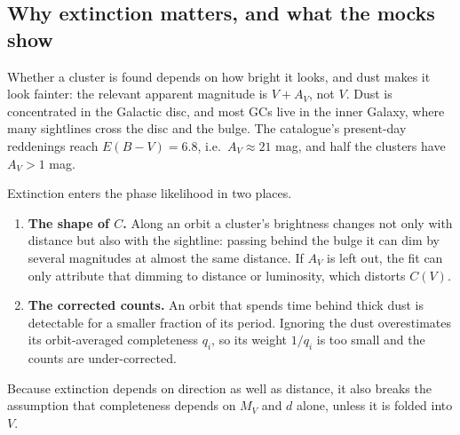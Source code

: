 \documentclass[11pt,a4paper]{article}
\newcommand{\MV}{M_V}
\newcommand{\dhel}{d}
\begin{document}
\subsection{Why extinction matters, and what the mocks show}
\label{sec:whydust}

Whether a cluster is found depends on how bright it looks, and dust makes it look fainter: the
relevant apparent magnitude is $V + A_V$, not $V$. Dust is concentrated in the Galactic disc, and
most GCs live in the inner Galaxy, where many sightlines cross the disc and the bulge. The
catalogue's present-day reddenings reach $E(B-V) = 6.8$, i.e.\ $A_V \approx 21$ mag, and half the
clusters have $A_V > 1$ mag.

Extinction enters the phase likelihood in two places.
\begin{enumerate}
\item \textbf{The shape of $C$.} Along an orbit a cluster's brightness changes not only with distance
but also with the sightline: passing behind the bulge it can dim by several magnitudes at almost
the same distance. If $A_V$ is left out, the fit can only attribute that dimming to distance or
luminosity, which distorts $C(V)$.
\item \textbf{The corrected counts.} An orbit that spends time behind thick dust is detectable for a
smaller fraction of its period. Ignoring the dust overestimates its orbit-averaged completeness
$q_i$, so its weight $1/q_i$ is too small and the counts are under-corrected.
\end{enumerate}
Because extinction depends on direction as well as distance, it also breaks the assumption that
completeness depends on $\MV$ and $\dhel$ alone, unless it is folded into $V$.
\end{document}
